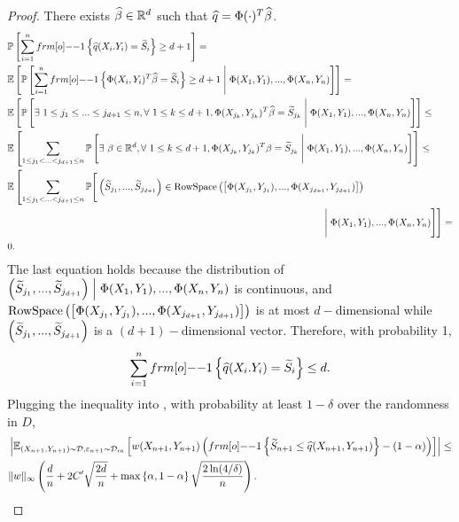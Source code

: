\begin{proof}
There exists $\widehat{\beta} \in \mathbb{R}^d$ such that $\widehat q = \Phi(\cdot)^T \widehat{\beta} $.
\begin{align*}
    &\PP\qth{ \sum_{i=1}^n \11 \sth{\hat q(X_i.Y_i)=\tS_i}  \geq d+1} = \\
    &\EE\qth{\PP\qth{ \sum_{i=1}^n \11 \sth{\Phi(X_i,Y_i)^T\hbeta=\tS_i}  \geq d+1 \Biggm| \Phi(X_1,Y_1),...,\Phi(X_n,Y_n) }} = \\
    &\EE\qth{\PP\qth{ \exists~1 \leq j_1 \leq ... \leq j_{d+1} \leq n, \forall~1\leq k \leq d+1, \Phi(X_{j_k},Y_{j_k})^T\hbeta=\tS_{j_k} \Biggm| \Phi(X_1,Y_1),...,\Phi(X_n,Y_n) }} \leq \\
    &\EE\qth{ \sum_{1 \leq j_1 < ... < j_{d+1} \leq n} \PP\qth{ \exists~\beta\in\RR^d, \forall~1\leq k \leq d+1, \Phi(X_{j_k},Y_{j_k})^T\beta=\tS_{j_k} \Biggm| \Phi(X_1,Y_1),...,\Phi(X_n,Y_n) } } \leq \\
    &\EE\left[ \sum_{1 \leq j_1 < ... < j_{d+1} \leq n}  \PP\Bigg[ \pth{\tS_{j_1}, ..., \tS_{j_{d+1}} } \in \operatorname{RowSpace}\pth{\qth{\Phi(X_{j_1},Y_{j_1}),...,\Phi(X_{j_{d+1}},Y_{j_{d+1}})}} \right.\\
    &\left. \hspace{4.5in} \Biggm| \Phi(X_1,Y_1),...,\Phi(X_n,Y_n) \Bigg] \right] = \\
    &0.
\end{align*}
The last equation holds because the distribution of $\left( {\widetilde{S}}_{j_1}, ..., {\widetilde{S}}_{j_{d+1}}  \right) \Bigm| \Phi(X_1,Y_1),...,\Phi(X_n,Y_n)$ is continuous, and $\operatorname{RowSpace}\left( \left[ \Phi(X_{j_1},Y_{j_1}),...,\Phi(X_{j_{d+1}},Y_{j_{d+1}}) \right] \right)$ is at most $d-$dimensional while $\left( {\widetilde{S}}_{j_1}, ..., {\widetilde{S}}_{j_{d+1}}  \right)$ is a $(d+1)-$dimensional vector. Therefore, with probability 1,
\begin{align*}
    \sum_{i=1}^n \11 \sth{\hat q(X_i.Y_i)=\tS_i} \leq d.
\end{align*}
Plugging the inequality into , with probability at least $1-\delta$ over the randomness in $D$,
\begin{align*}
    &\left| \EE_{(X_{n+1},Y_{n+1}) \sim\calD, \varepsilon_{n+1} \sim \calD_{\text{rn}}} \qth{w(X_{n+1},Y_{n+1}) \pth{\11\sth{\tS_{n+1} \leq 
    \hat q(X_{n+1},Y_{n+1}) } - (1-\alpha) }} \right| \leq \\
    &\|w\|_\infty \pth{\frac{d}{n} + 2C' \sqrt {\frac{2d}{n}} + \max\sth{\alpha, 1-\alpha}  \sqrt{\frac{2 \ln(4/\delta)}{n}}}.
\end{align*}
\end{proof}

